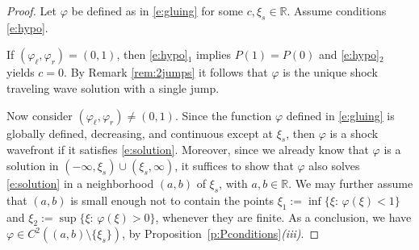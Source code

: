 \documentclass[10pt,a4paper]{amsart}
\renewcommand{\phi}{\varphi}
\begin{document}
\begin{proof}
Let $\phi$ be defined as in \eqref{e:gluing} for some $c, \xi_s \in \mathbb{R}$. Assume  conditions  \eqref{e:hypo}. 

If  $(\varphi_\ell,\varphi_r)=(0,1)$, then \eqref{e:hypo}$_1$ implies $P(1)=P(0)$ and \eqref{e:hypo}$_2$ yields $c=0$. By Remark \ref{rem:2jumps} it follows that $\phi$ is the unique shock traveling wave solution with a single jump. 

Now consider $(\varphi_\ell, \varphi_r)\neq (0,1)$. Since the function $\varphi$ defined in \eqref{e:gluing} is globally defined, decreasing, and continuous except at $\xi_s$, then $\phi$ is a shock wavefront if it satisfies \eqref{e:solution}. Moreover, since we already know that $\phi$ is a solution in $(-\infty,\xi_s)\cup(\xi_s,\infty)$, it suffices to show that $\phi$ also solves \eqref{e:solution} in a neighborhood $(a,b)$ of $\xi_s$, with $a,b\in \mathbb{R}$. We may further assume that $(a,b)$ is small enough not to contain the points 
$\xi_1 := \inf\{\xi:\, \varphi(\xi)<1\}$ and $\xi_2 := \sup\{ \xi:\, \varphi(\xi)>0\}$,
whenever they are finite. As a conclusion, we have $\varphi \in C^2\left((a,b)\setminus\{\xi_s\}\right)$, by Proposition~\ref{p:Pconditions}{\em (iii)}. %


\end{proof}
\end{document}
